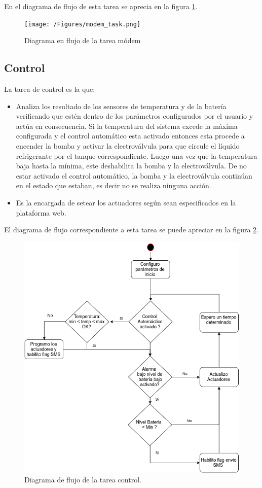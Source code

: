   En el diagrama de flujo de esta tarea se aprecia en la figura \ref{fig:modem_task}.

  \begin{figure}[!htp]
    \texttt{[image: /Figures/modem\_task.png]}
    \caption{Diagrama en flujo de la tarea módem}
    \label{fig:modem_task}
\end{figure}


\subsection*{Control}
La tarea de control es la que:
  
\begin{itemize}
  \item Analiza los resultado de los sensores de temperatura y de la batería verificando que estén dentro de los parámetros configurados por el usuario y actúa en consecuencia. Si la temperatura del sistema excede la máxima configurada y el control automático esta activado entonces esta procede a encender la bomba y activar la electroválvula para que circule el líquido refrigerante por el tanque correspondiente. Luego una vez que la temperatura baja hasta la mínima, este deshabilita la bomba y la electroválvula. De no estar activado el control automático, la bomba y la electroválvula continúan en el estado que estaban, es decir no se realiza ninguna acción.
  \item Es la encargada de setear los actuadores según sean especificados en la plataforma web.
\end{itemize}

El diagrama de flujo correspondiente a esta tarea se puede apreciar en la figura \ref{fig:control_task}.
\begin{figure}[hp]
  \includegraphics[scale=.5]{./Figures/control_task.png}
  \caption{Diagrama de flujo de la tarea control.}
  \label{fig:control_task}
\end{figure}


